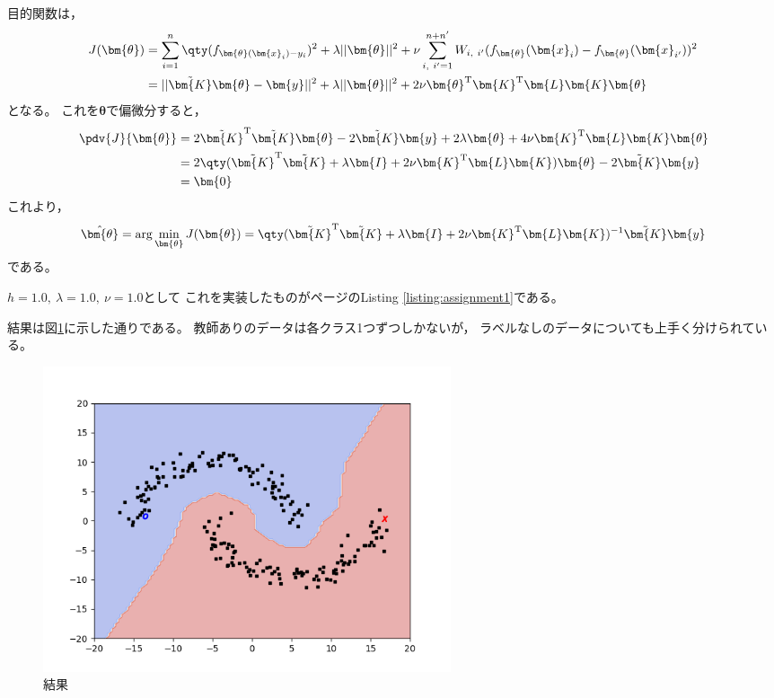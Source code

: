 \documentclass[class=jsarticle, crop=false, dvipdfmx, fleqn]{standalone}
\begin{document}
目的関数は，
\begin{align}
    J(\bm{\theta})
        & = \sum_{i=1}^{n} \qty(f_{\bm{\theta} (\bm{x}_i) - y_i})^2
            + \lambda ||\bm{\theta}||^2
                + \nu \sum_{i,\ i' = 1}^{n+n'} W_{i,\ i'} (f_{\bm{\theta}} (\bm{x}_i) - f_{\bm{\theta}} (\bm{x}_{i'}))^2 \\
        & = ||\tilde{\bm{K}} \bm{\theta} - \bm{y}||^2
            + \lambda ||\bm{\theta}||^2
            + 2 \nu \bm{\theta}^\mathrm{T} \bm{K}^\mathrm{T} \bm{L} \bm{K} \bm{\theta}
\end{align}
となる。
これを\(\bm{\theta}\)で偏微分すると，
\begin{align}
    \pdv{J}{\bm{\theta}}
        & = 2 \tilde{\bm{K}}^\mathrm{T} \tilde{\bm{K}} \bm{\theta}
            - 2 \tilde{\bm{K}} \bm{y}
            + 2 \lambda \bm{\theta}
            + 4 \nu \bm{K}^\mathrm{T} \bm{L} \bm{K} \bm{\theta} \\
        & = 2 \qty(\tilde{\bm{K}}^\mathrm{T} \tilde{\bm{K}} + \lambda \bm{I} + 2 \nu \bm{K}^\mathrm{T} \bm{L} \bm{K}) \bm{\theta}
            - 2 \tilde{\bm{K}} \bm{y} \\
        & = \bm{0}
\end{align}
これより，
\begin{equation}
    \hat{\bm{\theta}}
        = \arg\min_{\bm{\theta}} J(\bm{\theta})
        = \qty(\tilde{\bm{K}}^\mathrm{T} \tilde{\bm{K}} + \lambda \bm{I} + 2 \nu \bm{K}^\mathrm{T} \bm{L} \bm{K})^{-1} \tilde{\bm{K}} \bm{y}
\end{equation}
である。

\(h = 1.0,\ \lambda = 1.0,\ \nu = 1.0\)として
これを実装したものが\pageref{listing:assignment1}ページのListing \ref{listing:assignment1}である。

結果は図\ref{fig:result}に示した通りである。
教師ありのデータは各クラス1つずつしかないが，
ラベルなしのデータについても上手く分けられている。


\begin{figure}[H]
    \centering
    \includegraphics[clip, width=12cm]{../figures/assignment1_result}
    \caption{結果}
    \label{fig:result}
\end{figure}
\end{document}
